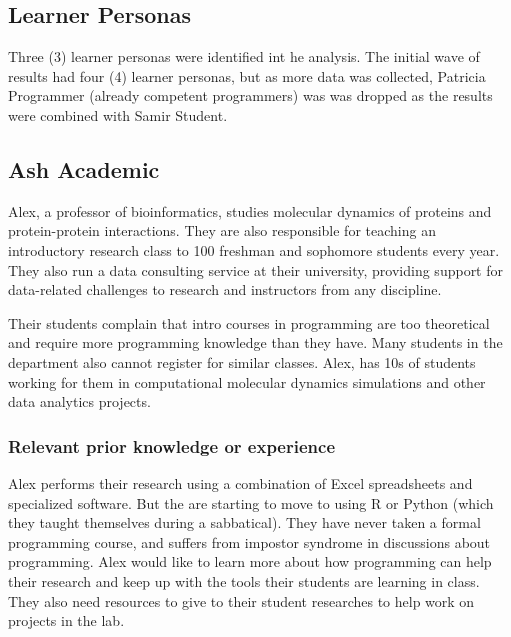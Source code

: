\documentclass[020-persona\_validation.tex]{subfiles}
\begin{document}
\subsection{Learner Personas}
\label{sse:learner-personas}

    Three (3) learner personas were identified int he analysis.
    The initial wave of results had four (4) learner personas,
    but as more data was collected, Patricia Programmer
    (already competent programmers)
    was was dropped as the results were combined with Samir Student.

    \subsection{Ash Academic}

        Alex, a professor of bioinformatics,
        studies molecular dynamics of proteins and protein-protein interactions.
        They are also responsible for teaching an introductory research class to 100 freshman and sophomore students every year.
        They also run a data consulting service at their university,
        providing support for data-related challenges to research and instructors from any discipline.

        Their students complain that intro courses in programming are too theoretical and
        require more programming knowledge than they have.
        Many students in the department also cannot register for similar classes.
        Alex, has 10s of students working for them in computational molecular dynamics simulations and other data analytics projects.

        \subsubsection{Relevant prior knowledge or experience}

            Alex performs their research using a combination of
            Excel spreadsheets and specialized software.
            But the are starting to move to using R or Python (which they taught themselves during a sabbatical).
            They have never taken a formal programming course,
            and suffers from impostor syndrome in discussions about programming.
            Alex would like to learn more about how programming can help their research and
            keep up with the tools their students are learning in class.
            They also need resources to give to their student researches to help work on projects in the lab.
\end{document}
